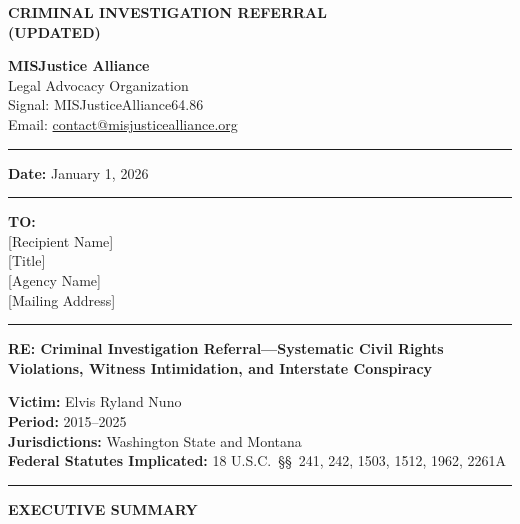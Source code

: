 \documentclass[11pt, letterpaper]{article}
\newcommand{\sectiontitle}[1]{\vspace{0.2in}\noindent\textcolor{NavyBlue}{\large\textbf{#1}}\vspace{0.1in}}
\newcommand{\subsectiontitle}[1]{\vspace{0.15in}\noindent\textcolor{NavyBlue}{\textbf{#1}}\vspace{0.05in}}
\begin{document}
\thispagestyle{firstpage}

\begin{center}
\textcolor{NavyBlue}{\LARGE\textbf{CRIMINAL INVESTIGATION REFERRAL}}\\[6pt]
\textcolor{NavyBlue}{\large\textbf{(UPDATED)}}
\end{center}

\vspace{0.1in}

\noindent
\textbf{MISJustice Alliance}\\
Legal Advocacy Organization\\
Signal: MISJusticeAlliance64.86\\
Email: \href{mailto:contact@misjusticealliance.org}{contact@misjusticealliance.org}

\vspace{0.15in}
\noindent\rule{\textwidth}{0.4pt}
\vspace{0.1in}

\noindent\textbf{Date:} January 1, 2026

\vspace{0.1in}
\noindent\rule{\textwidth}{0.4pt}
\vspace{0.1in}

\noindent\textbf{TO:}\\
{[Recipient Name]}\\
{[Title]}\\
{[Agency Name]}\\
{[Mailing Address]}

\vspace{0.1in}
\noindent\rule{\textwidth}{0.4pt}
\vspace{0.15in}

\subsectiontitle{RE: Criminal Investigation Referral---Systematic Civil Rights Violations, Witness Intimidation, and Interstate Conspiracy}

\noindent
\textbf{Victim:} Elvis Ryland Nuno\\
\textbf{Period:} 2015--2025\\
\textbf{Jurisdictions:} Washington State and Montana\\
\textbf{Federal Statutes Implicated:} 18 U.S.C.\ \S\S\ 241, 242, 1503, 1512, 1962, 2261A

\vspace{0.1in}
\noindent\rule{\textwidth}{0.4pt}

\sectiontitle{EXECUTIVE SUMMARY}
\end{document}
